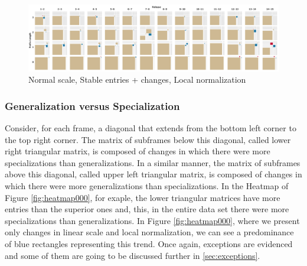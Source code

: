 \begin{figure}[htb]
  \centering
  \includegraphics[width=17cm]{images/squaremap010.png}
  \caption{Normal scale, Stable entries + changes, Local normalization}
  \label{fig:heatmap010}
\end{figure}

\subsubsection{Generalization versus Specialization}


Consider, for each frame, a diagonal that extends from the bottom left corner to the top right corner. The matrix of subframes below this diagonal, called lower right triangular matrix, is composed of changes in which there were more specializations than generalizations. In a similar manner, the matrix of subframes above this diagonal, called upper left triangular matrix, is composed of changes in which there were more generalizations than specializations. In the Heatmap of Figure \ref{fig:heatmap000}, for exaple, the lower triangular matrices have more entries than the superior ones and, this, in the entire data set there were more specializations than generalizations. In Figure \ref{fig:heatmap000}, where we present only changes in linear scale and local normalization, we can see a predominance of blue rectangles representing this trend. Once again, exceptions are evidenced and some of them are going to be discussed further in \ref{sec:exceptions}.


